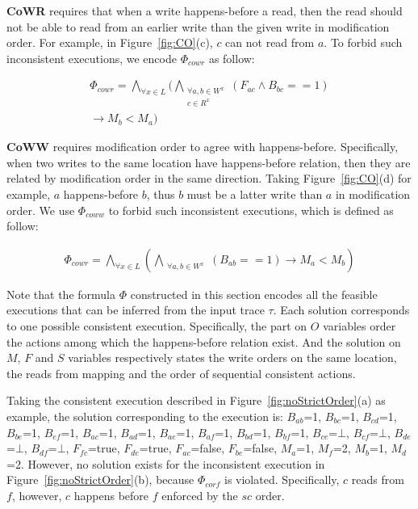 \documentclass[preprint, numbers, 10pt]{sigplanconf}
\begin{document}
\textbf{CoWR} requires that when a write happens-before a read, then the read should 
not be able to read from an earlier write than the given write in modification order. 
For example, in Figure~\ref{fig:CO}(c),
$c$ can not read from $a$. To forbid such inconsistent executions, we 
encode $\Phi_{cowr}$ as follow: 

\begin{equation}
\begin{aligned}
\Phi_{cowr} = \bigwedge_{\forall x\in L}(\bigwedge_{\substack{\forall a,b\in W^x\\c\in R^x}}
(F_{ac}\wedge B_{bc}==1)\\ \rightarrow M_{b}<M_{a})
\end{aligned}
\end{equation} 

\textbf{CoWW} requires modification order to agree with happens-before. 
Specifically, when two writes to the same location have happens-before relation,
then they are related by modification order in the same direction. 
Taking Figure~\ref{fig:CO}(d) for example, $a$ happens-before $b$, thus $b$ 
must be a latter write than $a$ in modification order. 
We use $\Phi_{coww}$ to forbid such inconsistent executions, which is defined 
as follow: 

\begin{equation}
\begin{aligned}
\Phi_{cowr} = \bigwedge_{\forall x\in L}(\bigwedge_{\substack{\forall a,b\in W^x}}
(B_{ab}==1)\rightarrow M_{a}<M_{b})
\end{aligned}
\end{equation} 


Note that the formula $\Phi$ constructed in this section
encodes all the feasible executions that can be inferred from the 
input trace $\tau$. 
Each solution corresponds to one possible consistent execution.
Specifically, the part on $O$ variables order the actions among which 
the happens-before relation exist. And the solution on $M$, $F$ and $S$ 
variables respectively states the write orders on the same location, the reads
from mapping and the order of sequential consistent actions. 

Taking the consistent execution described in Figure~\ref{fig:noStrictOrder}(a)
as example, the solution corresponding to the execution is: 
$B_{ab}$=1, $B_{bc}$=1, $B_{cd}$=1, $B_{be}$=1, $B_{ef}$=1, $B_{ac}$=1, 
$B_{ad}$=1, $B_{ae}$=1, $B_{af}$=1, $B_{bd}$=1, $B_{bf}$=1, $B_{ce}$=$\bot$, 
$B_{cf}$=$\bot$, $B_{de}$=$\bot$, $B_{df}$=$\bot$, 
$F_{fc}$=true, $F_{de}$=true, $F_{ac}$=false, $F_{be}$=false,
$M_a$=1, $M_f$=2, $M_b$=1, $M_d$=2. 
However, no solution exists for the
inconsistent execution in Figure~\ref{fig:noStrictOrder}(b), 
because $\Phi_{corf}$ is violated. Specifically, $c$ reads from $f$, 
however, $c$ happens before $f$ enforced by the $sc$ order.
\end{document}
